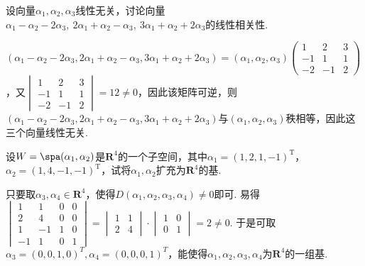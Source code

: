 \begin{exercise}
\begin{exgroup}
        \item 设向量$\alpha_1,\alpha_2,\alpha_3$线性无关，讨论向量$\alpha_1-\alpha_2-2\alpha_3,\ 2\alpha_1+\alpha_2-\alpha_3,\ 3\alpha_1+\alpha_2+2\alpha_3$的线性相关性.
        \begin{answer}
            $(\alpha_1-\alpha_2-2\alpha_3,2\alpha_1+\alpha_2-\alpha_3,3\alpha_1+\alpha_2+2\alpha_3)=(\alpha_1,\alpha_2,\alpha_3)\begin{pmatrix}
                1 & 2 & 3 \\ -1 & 1 & 1 \\ -2 & -1 & 2
            \end{pmatrix}$，又$\begin{vmatrix}
                1 & 2 & 3 \\ -1 & 1 & 1 \\ -2 & -1 & 2
            \end{vmatrix}=12\neq 0$，因此该矩阵可逆，则$(\alpha_1-\alpha_2-2\alpha_3,2\alpha_1+\alpha_2-\alpha_3,3\alpha_1+\alpha_2+2\alpha_3)$与$(\alpha_1,\alpha_2,\alpha_3)$秩相等，因此这三个向量线性无关.
        \end{answer}

        \item 设$W=\spa(\alpha_1,\alpha_2)$是$\mathbf{R}^4$的一个子空间，其中$\alpha_1=(1,2,1,-1)^\mathrm{T}$，$\alpha_2=(1,4,-1,-1)^\mathrm{T}$，试将$\alpha_1,\alpha_2$扩充为$\mathbf{R}^4$的基.
        \begin{answer}
            只要取$\alpha_3,\alpha_4 \in \mathbf{R}^4$，使得$D(\alpha_1,\alpha_2,\alpha_3,\alpha_4) \neq 0$即可. 易得$\begin{vmatrix}
                1  & 1  & 0 & 0 \\
                2  & 4  & 0 & 0 \\
                1  & -1 & 1 & 0 \\
                -1 & 1  & 0 & 1
            \end{vmatrix}=\begin{vmatrix}
                1 & 1 \\
                2 & 4
            \end{vmatrix} \cdot \begin{vmatrix}
                1 & 0 \\
                0 & 1
            \end{vmatrix}=2 \neq 0$. 于是可取$\alpha_3=(0,0,1,0)^T,\alpha_4=(0,0,0,1)^T$，能使得${\alpha_1,\alpha_2,\alpha_3,\alpha_4}$为$\mathbf{R}^4$的一组基.
        \end{answer}


\end{exgroup}
\end{exercise}
